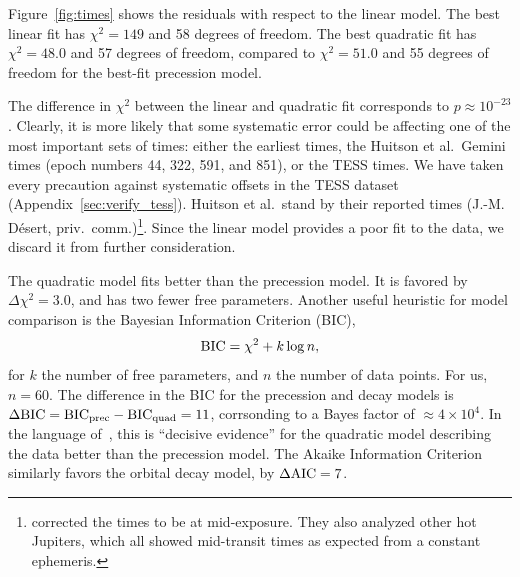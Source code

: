 \documentclass[12pt,twocolumn,tighten]{aastex62}
\begin{document}

Figure~\ref{fig:times} shows the residuals with respect to the linear
model.  The best linear fit has $\chi^2 = 149$ and 58 degrees of
freedom.  The best quadratic fit has $\chi^2 = 48.0$ and 57
degrees of freedom, compared to $\chi^2 = 51.0$
and 55 degrees of freedom for the best-fit precession model.

The difference in $\chi^2$ between the linear and quadratic fit
corresponds to $p \approx 10^{-23}$.
Clearly, it is more likely that some systematic error could be
affecting one of the most important sets of times: either the earliest
times, the Huitson et al.\ Gemini times (epoch numbers 44, 322, 591,
and 851), or the TESS times.  We have taken every precaution against
systematic offsets in the TESS dataset
(Appendix~\ref{sec:verify_tess}). Huitson et al.\ stand by their
reported times (J.-M. D\'esert, priv.\
comm.)\footnote{\citealt{huitson_gemini_2017} corrected the times to
be at mid-exposure. They also analyzed other hot Jupiters, which all
showed mid-transit times as expected from a constant ephemeris.}.
Since the linear model provides a poor fit to the data, we discard it
from further consideration.

The quadratic model fits better than the precession model.  It is
favored by $\Delta \chi^2 = 3.0$, and has two
fewer free parameters.  Another useful heuristic for model comparison is
the Bayesian Information Criterion (BIC),
\begin{equation}
  {\rm BIC} = \chi^2 + k\log n,
\end{equation}
for $k$ the number of free parameters, and $n$ the number of data
points. For us, $n=60$.  The difference in the BIC for the precession
and decay models is $\Delta {\rm BIC} = {\rm BIC}_{\rm prec} - {\rm
BIC}_{\rm quad} = 11$, corrsonding to a Bayes factor of $\approx
4\times10^{4}$.  In the language of~\citet{kass_bayes_1995}, this is
``decisive evidence'' for the quadratic model describing the data better
than the precession model.  The Akaike Information Criterion
similarly favors the orbital decay model, by $\Delta {\rm AIC} = 7$.
\end{document}
